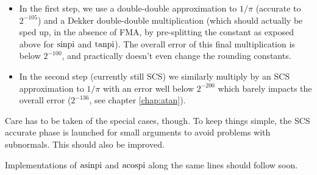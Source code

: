 \begin{itemize}
\item In the first step, we use a double-double approximation to
  $1/\pi$ (accurate to $2^{-105}$) and a Dekker double-double
  multiplication (which should actually be sped up, in the absence of
  FMA, by pre-splitting the constant as exposed above for $\operatorname{sinpi}$ and
  $\operatorname{tanpi}$).  The overall error of this final multiplication is below
  $2^{-100}$, and practically doesn't even change the rounding
  constants.

\item In the second step (currently still SCS) we similarly multiply 
  by an SCS approximation to $1/\pi$ with an  error well below $2^{-200}$
  which barely impacts the  overall error ($2^{-136}$, 
  see chapter \ref{chap:atan}).
\end{itemize}

Care has to be taken of the special cases, though. To keep things
simple, the SCS accurate phase is launched for small arguments to
avoid problems with subnormals. This should also be improved.



Implementations of $\operatorname{asinpi}$ and $\operatorname{acospi}$ along the same lines should
follow soon.
